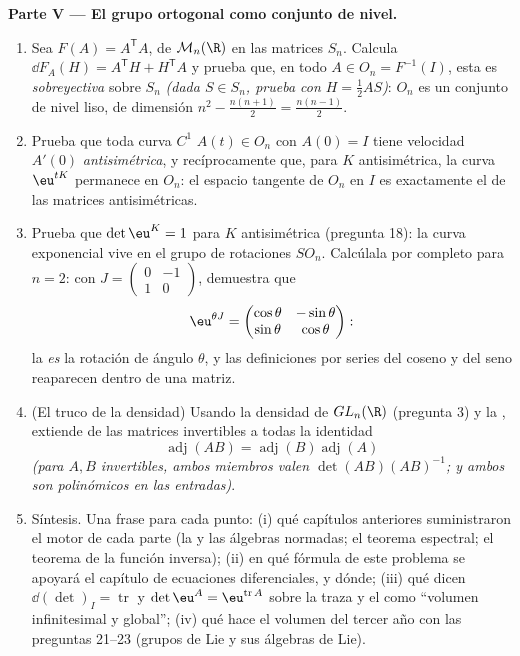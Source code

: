 \begin{problem}
\medskip
\noindent\textbf{Parte V --- El grupo ortogonal como conjunto de
nivel.}
\begin{enumerate}[resume]
  \item Sea $F(A) = A^{\mathsf T}A$, de $\mathcal M_n(\R)$ en las
        matrices  $S_n$. Calcula $\dd F_A(H) = A^{\mathsf
        T}H + H^{\mathsf T}A$ y prueba que, en todo $A \in O_n =
        F^{-1}(I)$, esta  es \emph{sobreyectiva} sobre
        $S_n$ \emph{(dada $S \in S_n$, prueba con $H = \frac12 AS$)}:
        $O_n$ es un conjunto de nivel liso, de dimensión $n^2 -
        \frac{n(n+1)}2 = \frac{n(n-1)}2$.
  \item Prueba que toda curva $C^1$ $A(t) \in O_n$ con $A(0) = I$
        tiene velocidad $A'(0)$ \emph{antisimétrica}, y
        recíprocamente que, para $K$ antisimétrica, la curva
        $\eu^{tK}$ permanece en $O_n$: el espacio tangente de $O_n$
        en $I$ es exactamente el de las matrices antisimétricas.
  \item Prueba que $\det\eu^{K} = 1$ para $K$ antisimétrica
        (pregunta 18): la curva exponencial vive en el grupo de
        rotaciones $SO_n$. Calcúlala por completo para $n = 2$: con
        $J = \begin{pmatrix}0 & -1\\ 1 & 0\end{pmatrix}$, demuestra
        que
        \[
        \eu^{\theta J} = \begin{pmatrix} \cos\theta &
        -\sin\theta\\ \sin\theta & \cos\theta\end{pmatrix} :
        \]
        la  \emph{es} la rotación de ángulo
        $\theta$, y las definiciones por series del coseno y del seno
        reaparecen dentro de una matriz.
  \item (El truco de la densidad) Usando la densidad de $GL_n(\R)$
        (pregunta 3) y la , extiende de las matrices
        invertibles a todas la identidad
        \[
        \operatorname{adj}(AB) =
        \operatorname{adj}(B)\operatorname{adj}(A)
        \]
        \emph{(para $A, B$ invertibles, ambos miembros valen
        $\det(AB)(AB)^{-1}$; y ambos son polinómicos en las
        entradas)}.
  \item Síntesis. Una frase para cada punto: (i) qué capítulos
        anteriores suministraron el motor de cada parte (la
         y las álgebras normadas; el teorema espectral; el
        teorema de la función inversa); (ii) en qué fórmula de este
        problema se apoyará el capítulo de ecuaciones diferenciales,
        y dónde; (iii) qué dicen $\dd(\det)_I = \operatorname{tr}$ y
        $\det\eu^A = \eu^{\operatorname{tr}A}$ sobre la traza y el
         como ``volumen infinitesimal y global''; (iv)
        qué hace el volumen del tercer año con las preguntas 21--23
        (grupos de Lie y sus álgebras de Lie).
\end{enumerate}
\end{problem}
